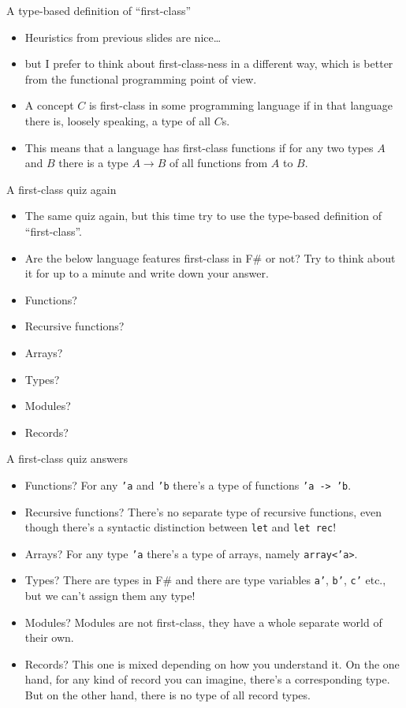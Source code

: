 \documentclass{beamer}
\newcommand{\m}[1]{\texttt{#1}}
\begin{document}
\begin{frame}{A type-based definition of ``first-class''}
\begin{itemize}
	\item Heuristics from previous slides are nice\dots
	\item but I prefer to think about first-class-ness in a different way, which is better from the functional programming point of view.
	\item A concept $C$ is first-class in some programming language if in that language there is, loosely speaking, a type of all $C$s.
	\item This means that a language has first-class functions if for any two types $A$ and $B$ there is a type $A \to B$ of all functions from $A$ to $B$.
\end{itemize}
\end{frame}

\begin{frame}{A first-class quiz again}
\begin{itemize}
	\item The same quiz again, but this time try to use the type-based definition of ``first-class''.
	\item Are the below language features first-class in F\# or not? Try to think about it for up to a minute and write down your answer.
	\item Functions?
	\item Recursive functions?
	\item Arrays?
	\item Types?
	\item Modules?
	\item Records?
\end{itemize}
\end{frame}

\begin{frame}{A first-class quiz answers}
\begin{itemize}
	\color{green} \item Functions? \color{black} For any \m{'a} and \m{'b} there's a type of functions \m{'a -> 'b}.
	\color{red} \item Recursive functions? \color{black} There's no separate type of recursive functions, even though there's a syntactic distinction between \m{let} and \m{let rec}!
	\color{green} \item Arrays? \color{black} For any type \m{'a} there's a type of arrays, namely \m{array<'a>}.
	\color{red} \item Types? \color{black} There are types in F\# and there are type variables \m{a'}, \m{b'}, \m{c'} etc., but we can't assign them any type!
	\color{red} \item Modules? \color{black} Modules are not first-class, they have a whole separate world of their own.
	\color{yellow}\item Records? \color{black} This one is mixed depending on how you understand it. On the one hand, for any kind of record you can imagine, there's a corresponding type. But on the other hand, there is no type of all record types.
\end{itemize}
\end{frame}
\end{document}
